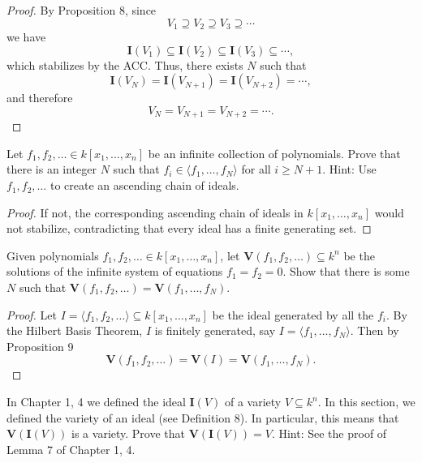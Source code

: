 \begin{proof}
    By Proposition 8, since 
    \[V_1 \supseteq V_2 \supseteq V_3 \supseteq \cdots\]
    we have 
    \[\mathbf{I}(V_1) \subseteq \mathbf{I}(V_2) \subseteq \mathbf{I}(V_3) \subseteq \cdots,\]
    which stabilizes by the ACC. Thus, there exists $N$ such that
    \[\mathbf{I}(V_N) = \mathbf{I}(V_{N+1}) = \mathbf{I}(V_{N+2}) = \cdots,\]
    and therefore
    \[V_N = V_{N+1} = V_{N+2} = \cdots.\]
\end{proof}

\begin{tcolorbox}[title=Problem 14, breakable]
    Let $f_1, f_2, \ldots \in k[x_1, \ldots, x_n]$ be 
    an infinite collection of polynomials. Prove that 
    there is an integer $N$ such that 
    $f_i \in \langle f_1, \ldots, f_N \rangle$ for all 
    $i \ge N + 1$. Hint: Use $f_1, f_2, \ldots$ to create 
    an ascending chain of ideals.
\end{tcolorbox}

\begin{proof}
    If not, the corresponding ascending chain of ideals
    in $k[x_1,\dots,x_n]$ would not stabilize, 
    contradicting that every ideal has a finite generating set.
\end{proof}


\begin{tcolorbox}[title=Problem 15, breakable]
    Given polynomials $f_1, f_2, \ldots \in k[x_1, \ldots, x_n]$,
    let $\textbf{V}(f_1, f_2, \ldots) \subseteq k^n$ be the 
    solutions of the infinite system of equations 
    $f_1 = f_2 = 0$. Show that there is some $N$ such 
    that $\textbf{V}(f_1, f_2, \ldots) = \textbf{V}(f_1, \ldots, f_N)$.
\end{tcolorbox}

\begin{proof}
    Let $I = \langle f_1, f_2, \dots \rangle \subseteq k[x_1, \dots, x_n]$ 
        be the ideal generated by all the $f_i$. 
    By the Hilbert Basis Theorem, 
        $I$ is finitely generated, say $I = \langle f_1, \dots, f_N \rangle$. 
    Then by Proposition 9
    \[\textbf{V}(f_1, f_2, \dots) = \textbf{V}(I) = \textbf{V}(f_1, \dots, f_N).\]
\end{proof}

\begin{tcolorbox}[title=Problem 16, breakable]
    In Chapter 1, 4 we defined the ideal $\textbf{I}(V)$
    of a variety $V \subseteq k^n$. In this section,
    we defined the variety of an ideal (see Definition 8).
    In particular, this means that $\textbf{V}(\textbf{I}(V))$
    is a variety. Prove that $\textbf{V}(\textbf{I}(V)) = V$.
    Hint: See the proof of Lemma 7 of Chapter 1, 4.
\end{tcolorbox}

